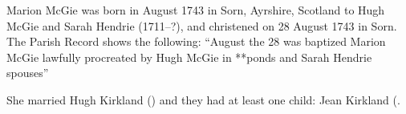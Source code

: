 
Marion McGie was born in August 1743 in	Sorn, Ayrshire, Scotland to Hugh McGie and Sarah Hendrie (1711--?), and christened on 28 August 1743 in Sorn. The Parish Record shows the following: ``August the 28 was baptized Marion McGie lawfully procreated by Hugh McGie in **ponds and Sarah Hendrie spouses'' \cite{MMcGieBirth}

She married Hugh Kirkland () and they had at least one child: Jean Kirkland (.
